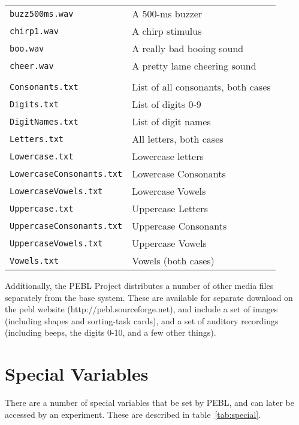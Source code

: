 \begin{longtable}{ll}
\texttt{buzz500ms.wav}   &A 500-ms buzzer\\
\texttt{chirp1.wav}      &A chirp stimulus\\
\texttt{boo.wav}         &A really bad booing sound\\
\texttt{cheer.wav}       &A pretty lame cheering sound\\
\addlinespace[.1cm]
\midrule
\addlinespace[.2cm]
\multicolumn{2}{l}{\textbf{In `media/text/'}:}\\
\addlinespace[.2cm]
\texttt{Consonants.txt}  &List of all consonants, both cases\\
\texttt{Digits.txt}               &List of digits 0-9\\
\texttt{DigitNames.txt}           &List of digit names\\
\texttt{Letters.txt}              &All letters, both cases\\
\texttt{Lowercase.txt}            &Lowercase letters\\
\texttt{LowercaseConsonants.txt}  &Lowercase Consonants\\
\texttt{LowercaseVowels.txt}      &Lowercase Vowels\\
\texttt{Uppercase.txt}            &Uppercase Letters\\
\texttt{UppercaseConsonants.txt}  &Uppercase Consonants\\
\texttt{UppercaseVowels.txt}      &Uppercase Vowels\\
\texttt{Vowels.txt}               &Vowels (both cases)\\

\end{longtable}

Additionally, the PEBL Project distributes a number of other media
files separately from the base system.  These are available for separate
download on the pebl website (http://pebl.sourceforge.net), and
include a set of images (including shapes and sorting-task cards), and
a set of auditory recordings (including beeps, the digits 0-10, and a
few other things).

\vspace{1cm}


\section{Special Variables}

There are a number of special variables that be set by PEBL, 
and can later be accessed by an experiment. These are described in table~\ref{tab:special}.

